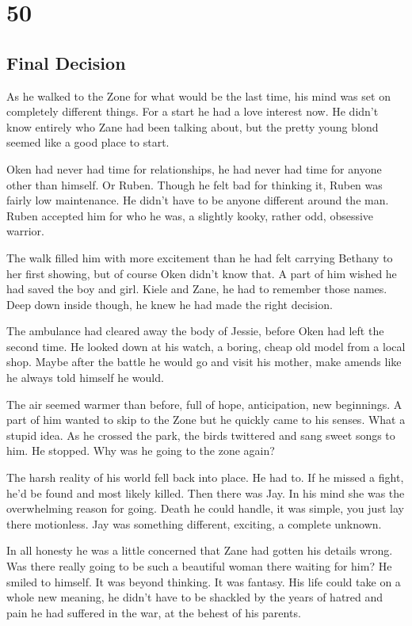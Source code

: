 \chapter{50}
\section{Final Decision}


As he walked to the Zone for what would be the last time, his mind was set on completely different things.  For a start he had a love interest now.  He didn't know entirely who Zane had been talking about, but the pretty young blond seemed like a good place to start.  

Oken had never had time for relationships, he had never had time for anyone other than himself.  Or Ruben.  Though he felt bad for thinking it, Ruben was fairly low maintenance.  He didn't have to be anyone different around the man.  Ruben accepted him for who he was, a slightly kooky, rather odd, obsessive warrior.

The walk filled him with more excitement than he had felt carrying Bethany to her first showing, but of course Oken didn't know that.  A part of him wished he had saved the boy and girl.  Kiele and Zane, he had to remember those names.  Deep down inside though, he knew he had made the right decision.  

The ambulance had cleared away the body of Jessie, before Oken had left the second time.  He looked down at his watch, a boring, cheap old model from a local shop.  Maybe after the battle he would go and visit his mother, make amends like he always told himself he would.

The air seemed warmer than before, full of hope, anticipation, new beginnings.  A part of him wanted to skip to the Zone but he quickly came to his senses.  What a stupid idea.  As he crossed the park, the birds twittered and sang sweet songs to him.  He stopped.  Why was he going to the zone again?

The harsh reality of his world fell back into place.  He had to.  If he missed a fight, he'd be found and most likely killed.  Then there was Jay.  In his mind she was the overwhelming reason for going.  Death he could handle, it was simple, you just lay there motionless.  Jay was something different, exciting, a complete unknown.  

In all honesty he was a little concerned that Zane had gotten his details wrong.  Was there really going to be such a beautiful woman there waiting for him?  He smiled to himself.  It was beyond thinking.  It was fantasy.  His life could take on a whole new meaning, he didn't have to be shackled by the years of hatred and pain he had suffered in the war, at the behest of his parents.  

